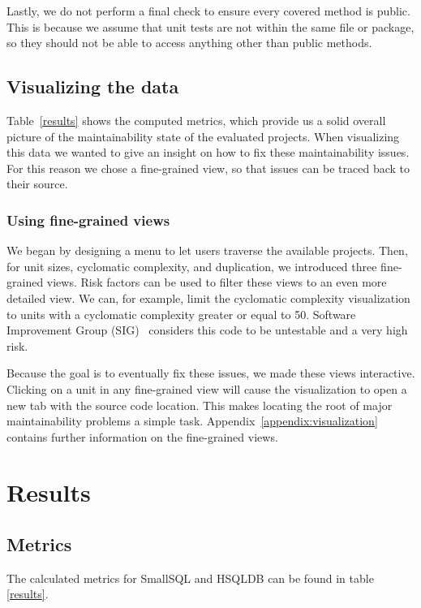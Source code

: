 \documentclass{article}
\begin{document}
Lastly, we do not perform a final check to ensure every covered method is public. This is because we assume that unit tests are not within the same file or package, so they should not be able to access anything other than public methods.

\subsection{Visualizing the data}
Table~\ref{results} shows the computed metrics, which provide us a solid overall picture of the maintainability state of the evaluated projects.
When visualizing this data we wanted to give an insight on how to fix these maintainability issues. 
For this reason we chose a fine-grained view, so that issues can be traced back to their source.

\subsubsection{Using fine-grained views}
We began by designing a menu to let users traverse the available projects.
Then, for unit sizes, cyclomatic complexity, and duplication, we introduced three fine-grained views.
Risk factors can be used to filter these views to an even more detailed view.
We can, for example, limit the cyclomatic complexity visualization to units with a cyclomatic complexity greater or equal to 50.
Software Improvement Group (SIG)~\cite{SIG} considers this code to be untestable and a very high risk.

Because the goal is to eventually fix these issues, we made these views interactive.
Clicking on a unit in any fine-grained view will cause the visualization to open a new tab with the source code location.
This makes locating the root of major maintainability problems a simple task.
Appendix~\ref{appendix:visualization} contains further information on the fine-grained views.

\section{Results}

\subsection{Metrics}
The calculated metrics for SmallSQL and HSQLDB can be found in table \ref{results}.
\end{document}
